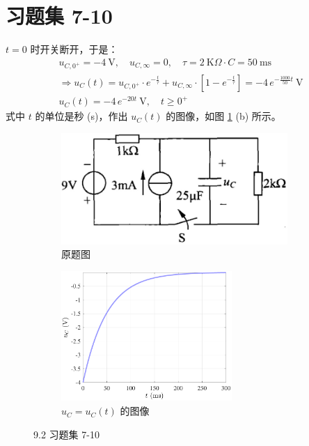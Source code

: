 \documentclass[UTF8]{report}
\def\kO{\ \mathrm{K}\Omega}
\theoremstyle{MyLineTheoremStyle} %
\theoremstyle{MyBlockTheoremStyle} %
\theoremstyle{MySubsubsectionStyle} %
\begin{document}
\section{习题集 7-10}
$t = 0$ 时开关断开，于是：
\begin{gather}
    u_{C,0^+}  = -4 \ \mathrm{V},\quad u_{C,\infty} = 0,\quad \tau = 2\kO \cdot C = 50 \ \mathrm{ms}  \\
    \Longrightarrow 
    u_C(t) = u_{C,0^+}\cdot e^{-\frac{t}{\tau}} + u_{C,\infty}\cdot \left[1 - e^{-\frac{t}{\tau}}\right] = -4 \,e^{- \frac{1000}{50} t} \ \mathrm{V} \\
    \boxed{
        u_C(t) = -4 \,e^{-20 t} \ \mathrm{V},\quad t \geqslant 0^+
    }
\end{gather}
式中 $t$ 的单位是秒 (s)，作出 $u_C(t)$ 的图像，如图 \ref{9.2 习题集 7-10} (b) 所示。
\begin{figure}[H]\centering
\begin{subfigure}[b]{0.5\columnwidth}\centering
    \includegraphics[height=120pt]{assets/9/9.2 (a).png}
    \caption{原题图}
\end{subfigure}\hfill
\begin{subfigure}[b]{0.5\columnwidth}\centering
    \includegraphics[height=140pt]{assets/9/9.2 b.pdf}
    \caption{$u_C = u_C(t)$ 的图像}
\end{subfigure}
\caption{9.2 习题集 7-10}
\label{9.2 习题集 7-10}
\end{figure}
\end{document}
